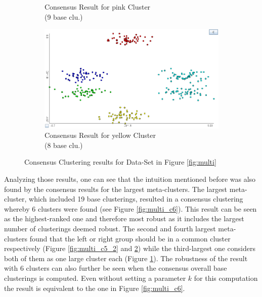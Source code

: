 \documentclass[
	a4paper,
	english,
	twoside,
	openright,               
	11pt                            
	]{report}
\begin{document}
\begin{figure}[h]
\begin{subfigure}[t]{.49\textwidth}
  \caption{Consensus Result for pink Cluster\\(9 base clu.)}
  \label{fig:multi_c4}
\end{subfigure}
\hfill
\begin{subfigure}[t]{.49\textwidth}
  \centering
  \includegraphics[width=.95\linewidth]{multi_c5_1}
  \caption{Consensus Result for yellow Cluster\\(8 base clu.)}
  \label{fig:multi_c5_1}
\end{subfigure}

\caption{Consensus Clustering results for Data-Set in Figure \ref{fig:multi}}
\label{fig:multi_consres}
\end{figure}

Analyzing those results, one can see that the intuition mentioned before was also found by the consensus results for the largest meta-clusters. The largest meta-cluster, which included 19 base clusterings, resulted in a consensus clustering whereby $6$ clusters were found (see Figure \ref{fig:multi_c6}). This result can be seen as the highest-ranked one and therefore most robust as it includes the largest number of clusterings deemed robust. The second and fourth largest meta-clusters found that the left or right group should be in a common cluster respectively (Figure \ref{fig:multi_c5_2} and \ref{fig:multi_c5_1}) while the third-largest one considers both of them as one large cluster each (Figure \ref{fig:multi_c4}). The robustness of the result with $6$ clusters can also further be seen when the consensus overall base clusterings is computed. Even without setting a parameter $k$ for this computation the result is equivalent to the one in Figure \ref{fig:multi_c6}.
\end{document}
